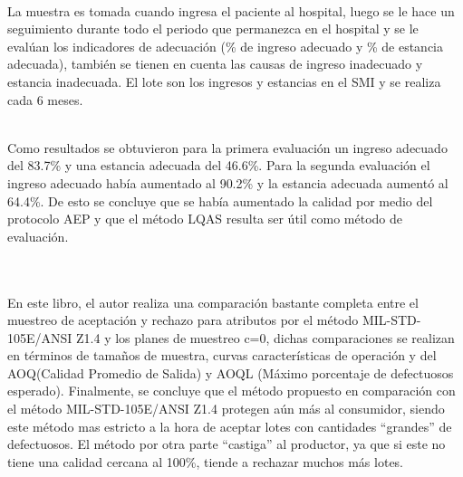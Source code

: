 ~\\La muestra es tomada cuando ingresa el paciente al hospital, luego se le hace un seguimiento durante todo el periodo que permanezca en el hospital y se le eval\'{u}an los indicadores de adecuaci\'{o}n (\% de ingreso adecuado y \% de estancia adecuada), tambi\'{e}n se tienen en cuenta las causas de ingreso inadecuado y estancia inadecuada. El lote son los ingresos y estancias en el SMI y se realiza cada 6 meses.

~\\Como resultados se obtuvieron para la primera evaluaci\'{o}n un ingreso adecuado del 83.7\% y una estancia adecuada del 46.6\%. Para la segunda evaluaci\'{o}n  el ingreso adecuado hab\'{i}a aumentado al 90.2\% y la estancia adecuada aument\'{o} al 64.4\%. De esto se concluye que se hab\'{i}a aumentado la calidad por medio del protocolo AEP y que el m\'{e}todo LQAS resulta ser \'{u}til como m\'{e}todo de evaluaci\'{o}n.


~\\\textbf{\citet{AE5}}
~\\En este libro, el autor realiza una comparaci\'{o}n bastante completa entre el muestreo de aceptaci\'{o}n y rechazo para atributos por el m\'{e}todo MIL-STD-105E/ANSI Z1.4 y los planes de muestreo c=0, dichas comparaciones se realizan en t\'{e}rminos de tama\~{n}os de muestra, curvas caracter\'{i}sticas de operaci\'{o}n y del AOQ(Calidad Promedio de Salida) y AOQL (M\'{a}ximo porcentaje de defectuosos esperado). Finalmente, se concluye que el m\'{e}todo propuesto en comparaci\'{o}n con el m\'{e}todo MIL-STD-105E/ANSI Z1.4 protegen a\'{u}n m\'{a}s al consumidor, siendo este m\'{e}todo mas estricto  a la hora de aceptar lotes con cantidades ``grandes'' de defectuosos. El m\'{e}todo por otra parte ``castiga'' al productor, ya que si este no tiene una calidad cercana al 100\%, tiende a rechazar muchos m\'{a}s lotes.